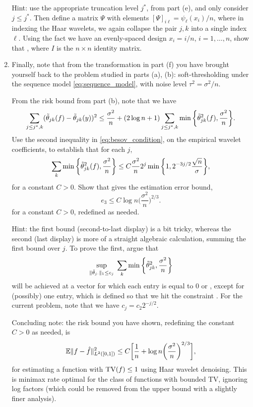 \documentclass{article}
\begin{document}
\begin{enumerate}[label=(\alph*)]
  Hint: use the appropriate truncation level $j^*$, from part (e), and only
  consider $j \leq j^*$. Then define a matrix $\Psi$ with elements $[\Psi]_{i
    \ell} = \psi_\ell(x_i)/n$, where in indexing the Haar wavelets, we again
  collapse the pair $j,k$ into a single index $\ell$. Using the fact we have an
  evenly-spaced design $x_i = i/n$, $i=1,\dots,n$, show that , where $I$ is the $n \times n$ identity matrix.        

\item Finally, note that from the transformation in part (f) you have brought
  yourself back to the problem studied in parts (a), (b): soft-thresholding
  under the sequence model \eqref{eq:sequence_model}, with noise level $\tau^2 =
  \sigma^2/n$. 

  From the risk bound from part (b), note that we have
  \[
  \sum_{j \leq j^*,k} (\tilde\theta_{jk}(f) - \tilde\theta_{jk}(y))^2 \leq 
  \frac{\sigma^2}{n} + (2 \log{n} + 1) \sum_{j \leq j^*,k} \min 
  \bigg \{ \tilde\theta_{jk}^2(f), \frac{\sigma^2}{n} \bigg\}.
  \]
  Use the second inequality in \eqref{eq:besov_condition}, on the empirical
  wavelet coefficients, to establish that for each $j$, 
  \marginpar{\small [4 pts]}
  \[
  \sum_k \min \bigg\{ \tilde\theta_{jk}^2(f), \frac{\sigma^2}{n} \bigg\} \leq
  C \frac{\sigma^2}{n} 2^j \min\bigg\{ 1, 2^{-3j/2} \frac{\sqrt{n}}{\sigma}
  \bigg\},  
  \]
  for a constant $C>0$. Show that gives the estimation error bound, 
  \marginpar{\small [2 pts]}
  \[
  e_3 \leq C \log{n} \bigg( \frac{\sigma^2}{n} \bigg)^{2/3}.
  \]
  for a constant $C>0$, redefined as needed.

  Hint: the first bound (second-to-last display) is a bit tricky, whereas the
  second (last display) is more of a straight algebraic calculation, summing the
  first bound over $j$. To prove the first, argue that 
  \[
  \sup_{\|\tilde\theta_{j \cdot}\|_1 \leq c_j} \; \sum_k \min \bigg\{
  \tilde\theta_{jk}^2, \frac{\sigma^2}{n} \bigg\}   
  \]
  will be achieved at a vector  for which each entry
  is equal to $0$ or , except for (possibly) one
  entry, which is defined so that we hit the constraint . For the current problem, note that we have $c_j = c_2
  2^{-j/2}$.   

  Concluding note: the risk bound you have shown, redefining the constant $C>0$
  as needed, is  
  \[
  \mathbb{E} \|f - \hat{f}\|_{L^2([0,1])}^2\leq C\bigg[ \frac{1}{n} + \log{n} \bigg(
  \frac{\sigma^2}{n} \bigg)^{2/3} \bigg],   
  \]
  for estimating a function with $\mathrm{TV}(f) \leq 1$ using Haar wavelet
  denoising. This is minimax rate optimal for the class of functions with
  bounded TV, ignoring log factors (which could be removed from the upper bound
  with a slightly finer analysis).
\end{enumerate}
\end{document}
